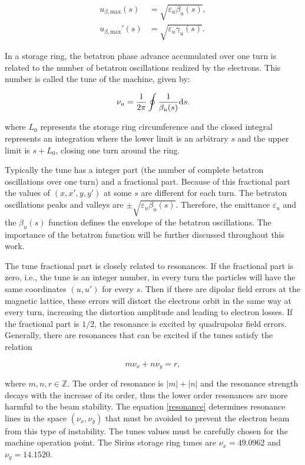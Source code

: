 \begin{align}
    u_{\beta, \mathrm{max}}(s) &= \sqrt{\varepsilon_u \beta_u(s)}, \\
    {u}_{\beta, \mathrm{max}}'(s) &= \sqrt{\varepsilon_u \gamma_u(s)}.
\end{align}

In a storage ring, the betatron phase advance accumulated over one turn is related to the number of betatron oscillations realized by the electrons. This number is called the tune of the machine, given by:

\begin{equation}
    \nu_u = \dfrac{1}{2\pi} \oint \dfrac{1}{\beta_u({s})} \mathrm{d} {s}.
\end{equation}

where $L_0$ represents the storage ring circumference and the closed integral represents an integration where the lower limit is an arbitrary $s$ and the upper limit is $s + L_0$, closing one turn around the ring.

Typically the tune has a integer part (the number of complete betatron oscillations over one turn) and a fractional part. Because of this fractional part the values of $(x, x', y, y')$ at some $s$ are different for each turn. The betraton oscillations peaks and valleys are $\pm \sqrt{\varepsilon_u \beta_u(s)}$. Therefore, the emittance $\varepsilon_u$ and the $\beta_u(s)$ function defines the envelope of the betatron oscillations. The importance of the betatron function will be further discussed throughout this work.

The tune fractional part is closely related to resonances. If the fractional part is zero, i.e., the tune is an integer number, in every turn the particles will have the same coordinates $(u, u')$ for every $s$. Then if there are dipolar field errors at the magnetic lattice, these errors will distort the electrons orbit in the same way at every turn, increasing the distortion amplitude and leading to electron losses. If the fractional part is $1/2$, the resonance is excited by quadrupolar field errors. Generally, there are resonances that can be excited if the tunes satisfy the relation

\begin{equation}
    m \nu_x + n \nu_y = r,
    \label{resonance}
\end{equation}

where $m, n, r \in \mathbb{Z}$. The order of resonance is $|m| + |n|$ and the resonance strength decays with the increase of its order, thus the lower order resonances are more harmful to the beam stability. The equation \eqref{resonance} determines resonance lines in the space $(\nu_x, \nu_y)$ that must be avoided to prevent the electron beam from this type of instability. The tunes values must be carefully chosen for the machine operation point. The Sirius storage ring tunes are $\nu_x = 49.0962$ and $\nu_y=14.1520$.


